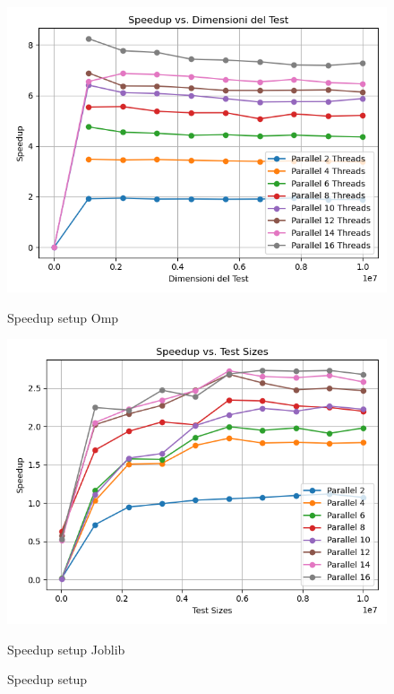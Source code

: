 \documentclass[11pt]{article}
\begin{document}
    \begin{figure}[H]
        \centering
        \includegraphics[width=\linewidth]{omp/005/setup_speedup_plot}
            \caption{Speedup setup Omp}\label{fig:005-setup_speedup_omp}
        \endminipage\hfill
        \includegraphics[width=\linewidth]{joblib/005/setup_speedup_plot}
            \caption{Speedup setup Joblib}\label{fig:005-setup_speedup_joblib}
        \endminipage\hfill
        \caption{Speedup setup}
    \end{figure}
\end{document}

